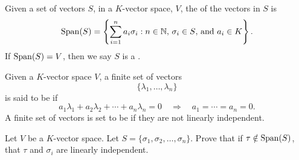 \documentclass{ximera}
\begin{document}
\begin{definition}
  Given a set of vectors $S$, in a $K$-vector space, $V$, the
   of the vectors in $S$ is
  \[
  \operatorname{Span}(S) = \left\{\sum_{i=1}^n a_i\sigma_i:\text{$n\in \mathbb N$,
    $\sigma_i\in S$, and $a_i\in K$}\right\}.
  \]
  If $\operatorname{Span}(S) = V$, then we say $S$ is a .
\end{definition}





\begin{definition}
  Given a $K$-vector space $V$, a finite set of vectors
  \[
  \{\lambda_1,\dots,\lambda_n\}
  \]
  is said to be  if
  \[
  a_1\lambda_1 + a_2\lambda_2 +\cdots + a_n\lambda_n = 0\quad \Rightarrow \quad a_1= \cdots =a_n = 0.
  \]
  A finite set of vectors is set to be  if
  they are not linearly independent.
\end{definition}



\begin{exercise}
  Let $V$ be a $K$-vector space. Let $S= \{\sigma_1,\sigma_2,
  \dots,\sigma_n\}$. Prove that if $\tau\notin\operatorname{Span}(S)$, that $\tau$
  and $\sigma_i$ are linearly independent.
\end{exercise}


\end{document}
